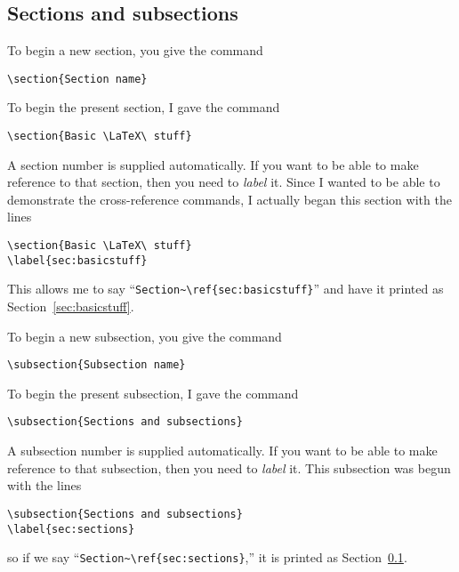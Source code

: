 \subsection{Sections and subsections}
\label{sec:sections}

To begin a new section, you give the command
\begin{center}
\verb"\section{Section name}"
\end{center}
To begin the present section, I gave the command
\begin{center}
\verb"\section{Basic \LaTeX\ stuff}"
\end{center}
A section number is supplied automatically.  If you want to be able
to make reference to that section, then you need to {\em label\/} it.
Since I wanted to be able to demonstrate the cross-reference
commands, I actually began this section with the lines
%
\begin{verbatim}
\section{Basic \LaTeX\ stuff}
\label{sec:basicstuff}
\end{verbatim}
%
This allows me to say ``\verb"Section~\ref{sec:basicstuff}"'' and have
it printed as Section~\ref{sec:basicstuff}.

To begin a new subsection, you give the command
\begin{center}
\verb"\subsection{Subsection name}"
\end{center}
To begin the present subsection, I gave the command
\begin{center}
\verb"\subsection{Sections and subsections}"
\end{center}
A subsection number is supplied automatically.  If you want to be able
to make reference to that subsection, then you need to {\em label\/}
it.  This subsection was begun with the lines
%
\begin{verbatim}
\subsection{Sections and subsections}
\label{sec:sections}
\end{verbatim}
%
so if we say ``\verb"Section~\ref{sec:sections}",'' it is printed as
Section~\ref{sec:sections}.

